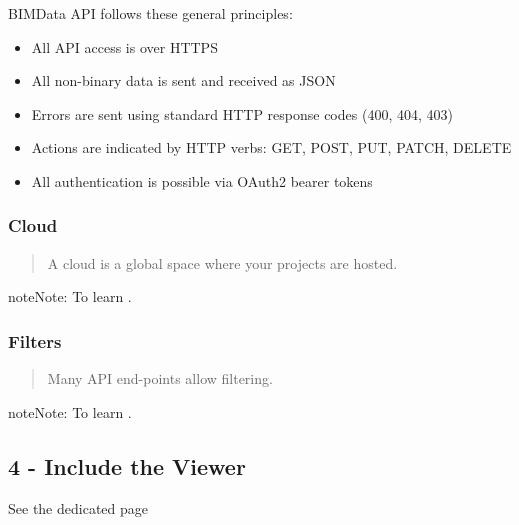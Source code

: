 \documentclass[a4paper,12pt,english]{sphinxmanual}
\begin{document}
BIMData API follows these general principles:
\begin{itemize}
\item {} 
All API access is over HTTPS

\item {} 
All non-binary data is sent and received as JSON

\item {} 
Errors are sent using standard HTTP response codes (400, 404, 403)

\item {} 
Actions are indicated by HTTP verbs: GET, POST, PUT, PATCH, DELETE

\item {} 
All authentication is possible via OAuth2 bearer tokens

\end{itemize}


\subsubsection{Cloud}
\label{\detokenize{tutorials/guided_tour:cloud}}\begin{quote}

A cloud is a global space where your projects are hosted.
\end{quote}

\begin{sphinxadmonition}{note}{Note:}
To learn .
\end{sphinxadmonition}


\subsubsection{Filters}
\label{\detokenize{tutorials/guided_tour:filters}}\begin{quote}

Many API end-points allow filtering.
\end{quote}

\begin{sphinxadmonition}{note}{Note:}
To learn .
\end{sphinxadmonition}


\subsection{4 - Include the Viewer}
\label{\detokenize{tutorials/guided_tour:include-the-viewer}}
See the dedicated page 
\end{document}
